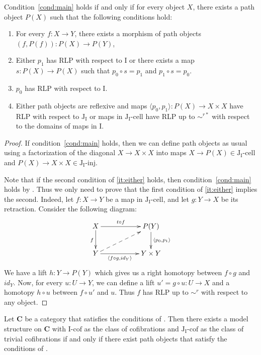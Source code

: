 \documentclass{tac}
\theoremstyle{definition}
\newcommand{\cat}[1]{\mathbf{#1}}
\newcommand{\C}{\cat{C}}
\newcommand{\I}{\mathrm{I}}
\newcommand{\J}{\mathrm{J}}
\newcommand{\class}[2]{#1\text{-}\mathrm{#2}}
\newcommand{\Iinj}[1][\I]{\class{#1}{inj}}
\newcommand{\Icell}[1][\I]{\class{#1}{cell}}
\newcommand{\Icof}[1][\I]{\class{#1}{cof}}
\newcommand{\Jinj}[1][]{\Iinj[\J#1]}
\newcommand{\Jcell}[1][]{\Icell[\J#1]}
\newcommand{\Jcof}[1][]{\Icof[\J#1]}
\begin{document}
\begin{prop}
Condition~\eqref{cond:main} holds if and only if for every object $X$,
there exists a path object $P(X)$ such that the following conditions hold:
\begin{enumerate}
\item For every $f : X \to Y$, there exists a morphism of path objects $(f,P(f)) : P(X) \to P(Y)$,
\item Either $p_1$ has RLP with respect to $\I$ or there exists a map $s : P(X) \to P(X)$ such that $p_0 \circ s = p_1$ and $p_1 \circ s = p_0$.
\item $p_0$ has RLP with respect to $\I$.
\item \label{it:either} Either path objects are reflexive and maps $\langle p_0, p_1 \rangle : P(X) \to X \times X$ have RLP with respect to $\J_\I$
or maps in $\Jcell[_\I]$ have RLP up to $\sim^{r*}$ with respect to the domains of maps in $\I$.
\end{enumerate}
\end{prop}
\begin{proof}
If condition~\eqref{cond:main} holds, then we can define path objects as usual using a factorization
of the diagonal $X \to X \times X$ into maps $X \to P(X) \in \Jcell[_\I]$ and $P(X) \to X \times X \in \Jinj[_\I]$.

Note that if the second condition of \eqref{it:either} holds, then condition~\eqref{cond:main} holds by .
Thus we only need to prove that the first condition of \eqref{it:either} implies the second.
Indeed, let $f : X \to Y$ be a map in $\Jcell[_\I]$, and let $g : Y \to X$ be its retraction.
Consider the following diagram:
\[ \xymatrix{ X \ar[rr]^-{t \circ f} \ar[d]_f & & P(Y) \ar[d]^{\langle p_0, p_1 \rangle} \\
              Y \ar[rr]_-{\langle f \circ g, id_Y \rangle} \ar@{-->}[urr] & & Y \times Y
            } \]
We have a lift $h : Y \to P(Y)$ which gives us a right homotopy between $f \circ g$ and $id_Y$.
Now, for every $u : U \to Y$, we can define a lift $u' = g \circ u : U \to X$ and a homotopy $h \circ u$ between $f \circ u'$ and $u$.
Thus $f$ has RLP up to $\sim^r$ with respect to any object.
\end{proof}

\begin{cor}
Let $\C$ be a category that satisfies the conditions of .
Then there exists a model structure on $\C$ with $\Icof$ as the class of cofibrations and $\Jcof[_\I]$ as the class of trivial cofibrations
if and only if there exist path objects that satisfy the conditions of .
\end{cor}
\end{document}
